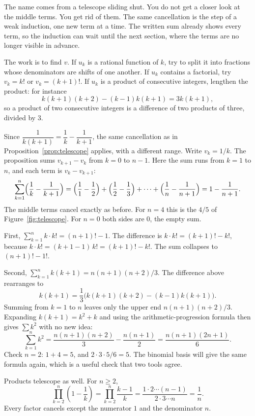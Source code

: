 The name comes from a telescope sliding shut. You do not get a closer look at the middle terms. You get rid of them. The same cancellation is the step of a weak induction, one new term at a time. The written sum already shows every term, so the induction can wait until the next section, where the terms are no longer visible in advance.

The work is to find $v$. If $u_k$ is a rational function of $k$, try to split it into fractions whose denominators are shifts of one another. If $u_k$ contains a factorial, try $v_k=k!$ or $v_k=(k+1)!$. If $u_k$ is a product of consecutive integers, lengthen the product: for instance
\[
k(k+1)(k+2)-(k-1)k(k+1)=3k(k+1),
\]
so a product of two consecutive integers is a difference of two products of three, divided by $3$.

\begin{example}
Since $\dfrac{1}{k(k+1)}=\dfrac1k-\dfrac1{k+1}$, the same cancellation as in Proposition~\ref{prop:telescope} applies, with a different range. Write $v_k=1/k$. The proposition sums $v_{k+1}-v_k$ from $k=0$ to $n-1$. Here the sum runs from $k=1$ to $n$, and each term is $v_k-v_{k+1}$:
\[
\sum_{k=1}^n\Bigl(\frac1k-\frac1{k+1}\Bigr)=\Bigl(\frac11-\frac12\Bigr)+\Bigl(\frac12-\frac13\Bigr)+\cdots+\Bigl(\frac1n-\frac1{n+1}\Bigr)=1-\frac1{n+1}.
\]
The middle terms cancel exactly as before. For $n=4$ this is the $4/5$ of Figure~\ref{fig:telescope}. For $n=0$ both sides are $0$, the empty sum.
\end{example}

\begin{examplex}
First, $\sum_{k=1}^nk\cdot k!=(n+1)!-1$. The difference is $k\cdot k!=(k+1)!-k!$, because $k\cdot k!=(k+1-1)\,k!=(k+1)!-k!$. The sum collapses to $(n+1)!-1!$.

Second, $\sum_{k=1}^nk(k+1)=n(n+1)(n+2)/3$. The difference above rearranges to
\[
k(k+1)=\frac13\bigl(k(k+1)(k+2)-(k-1)k(k+1)\bigr).
\]
Summing from $k=1$ to $n$ leaves only the upper end $n(n+1)(n+2)/3$. Expanding $k(k+1)=k^2+k$ and using the arithmetic-progression formula then gives $\sum k^2$ with no new idea:
\[
\sum_{k=1}^nk^2=\frac{n(n+1)(n+2)}{3}-\frac{n(n+1)}{2}=\frac{n(n+1)(2n+1)}{6}.
\]
Check $n=2$: $1+4=5$, and $2\cdot3\cdot5/6=5$. The binomial basis will give the same formula again, which is a useful check that two tools agree.

Products telescope as well. For $n\ge2$,
\[
\prod_{k=2}^n\left(1-\frac1k\right)=\prod_{k=2}^n\frac{k-1}{k}=\frac{1\cdot2\cdots(n-1)}{2\cdot3\cdots n}=\frac1n.
\]
Every factor cancels except the numerator $1$ and the denominator $n$.
\end{examplex}

